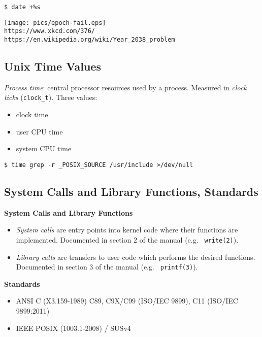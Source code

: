 \documentclass[xga]{xdvislides}
\begin{document}
\begin{verbatim}
$ date +%s
\end{verbatim}

\begin{center}
\texttt{[image: pics/epoch-fail.eps]} \\
\verb+https://www.xkcd.com/376/+ \\
\vspace{.25in}
\verb+https://en.wikipedia.org/wiki/Year_2038_problem+
\end{center}


\subsection{Unix Time Values}
{\em Process time}: central processor resources used by a process.
Measured in {\em clock ticks} ({\tt clock\_t}).  Three values:
\begin{itemize}
	\item clock time
	\item user CPU time
	\item system CPU time
\end{itemize}

\vspace*{\fill}
\begin{verbatim}
$ time grep -r _POSIX_SOURCE /usr/include >/dev/null
\end{verbatim}
\vspace*{\fill}

\subsection{System Calls and Library Functions, Standards}
{\bf System Calls and Library Functions}
\begin{itemize}
	\item {\em System calls} are entry points into kernel code where their functions
		are implemented.  Documented in section 2 of the manual (e.g. {\tt
		write(2)}).
	\item {\em Library calls} are transfers to user code which performs the desired
		functions. Documented in section 3 of the manual (e.g. {\tt
		printf(3)}).
\end{itemize}
\vspace{.5in}
{\bf Standards}
\begin{itemize}
	\item ANSI C (X3.159-1989) C89, C9X/C99 (ISO/IEC 9899), C11 (ISO/IEC 9899:2011)
	\item IEEE POSIX (1003.1-2008) / SUSv4
\end{itemize}
\end{document}
